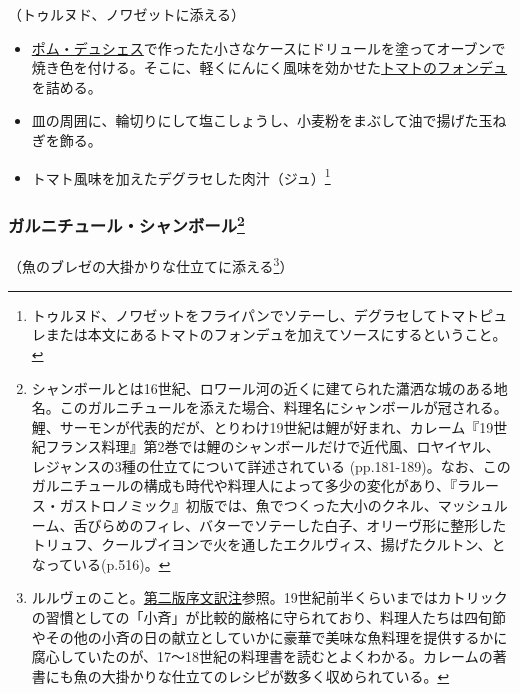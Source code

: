 \begin{recette}
（トゥルヌド、ノワゼットに添える）

\begin{itemize}
\item
  \protect\hyperlink{pommes-de-terre-duchesse}{ポム・デュシェス}で作ったた小さなケースにドリュールを塗ってオーブンで焼き色を付ける。そこに、軽くにんにく風味を効かせた\protect\hyperlink{portugaise}{トマトのフォンデュ}を詰める。
\item
  皿の周囲に、輪切りにして塩こしょうし、小麦粉をまぶして油で揚げた玉ねぎを飾る。
\item
  トマト風味を加えたデグラセした肉汁（ジュ）\footnote{トゥルヌド、ノワゼットをフライパンでソテーし、デグラセしてトマトピュレまたは本文にあるトマトのフォンデュを加えてソースにするということ。}
\end{itemize}

\hypertarget{garniture-chambord}{%
\subsubsection[ガルニチュール・シャンボール]{\texorpdfstring{ガルニチュール・シャンボール\footnote{シャンボールとは16世紀、ロワール河の近くに建てられた瀟洒な城のある地名。このガルニチュールを添えた場合、料理名にシャンボールが冠される。鯉、サーモンが代表的だが、とりわけ19世紀は鯉が好まれ、カレーム『19世紀フランス料理』第2巻では鯉のシャンボールだけで近代風、ロヤイヤル、レジャンスの3種の仕立てについて詳述されている
  (pp.181-189)。なお、このガルニチュールの構成も時代や料理人によって多少の変化があり、『ラルース・ガストロノミック』初版では、魚でつくった大小のクネル、マッシュルーム、舌びらめのフィレ、バターでソテーした白子、オリーヴ形に整形したトリュフ、クールブイヨンで火を通したエクルヴィス、揚げたクルトン、となっている(p.516)。}}{ガルニチュール・シャンボール}}\label{garniture-chambord}}



（魚のブレゼの大掛かりな仕立てに添える\footnote{ルルヴェのこと。\protect\hyperlink{releve}{第二版序文訳注}参照。19世紀前半くらいまではカトリックの習慣としての「小斉」が比較的厳格に守られており、料理人たちは四旬節やその他の小斉の日の献立としていかに豪華で美味な魚料理を提供するかに腐心していたのが、17〜18世紀の料理書を読むとよくわかる。カレームの著書にも魚の大掛かりな仕立てのレシピが数多く収められている。}）


\end{recette}
